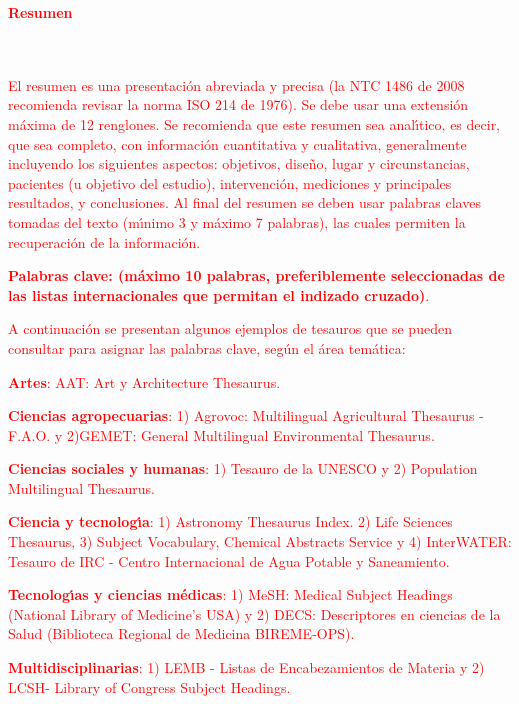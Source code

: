 
\newpage
\textcolor{red}{
\textbf{\LARGE Resumen}
\\\\
El resumen es una presentaci\'{o}n abreviada y precisa (la NTC 1486 de 2008 recomienda revisar la norma ISO 214 de 1976). Se debe usar una extensi\'{o}n m\'{a}xima de 12 renglones. Se recomienda que este resumen sea anal\'{\i}tico, es decir, que sea completo, con informaci\'{o}n cuantitativa y cualitativa, generalmente incluyendo los siguientes aspectos: objetivos, dise\~{n}o, lugar y circunstancias, pacientes (u objetivo del estudio), intervenci\'{o}n, mediciones y principales resultados, y conclusiones. Al final del resumen se deben usar palabras claves tomadas del texto (m\'{\i}nimo 3 y m\'{a}ximo 7 palabras), las cuales permiten la recuperaci\'{o}n de la informaci\'{o}n.\\
}

\textcolor{red}{
\textbf{\small Palabras clave: (m\'{a}ximo 10 palabras, preferiblemente seleccionadas de las listas internacionales que permitan el indizado cruzado)}.\\
}

\textcolor{red}{
A continuaci\'{o}n se presentan algunos ejemplos de tesauros que se pueden consultar para asignar las palabras clave, seg\'{u}n el \'{a}rea tem\'{a}tica:\\
}

\textcolor{red}{
\textbf{Artes}: AAT: Art y Architecture Thesaurus.
}

\textcolor{red}{
\textbf{Ciencias agropecuarias}: 1) Agrovoc: Multilingual Agricultural Thesaurus - F.A.O. y 2)GEMET: General Multilingual Environmental Thesaurus.
}

\textcolor{red}{
\textbf{Ciencias sociales y humanas}: 1) Tesauro de la UNESCO y 2) Population Multilingual Thesaurus.
}

\textcolor{red}{
\textbf{Ciencia y tecnolog\'{\i}a}: 1) Astronomy Thesaurus Index. 2) Life Sciences Thesaurus, 3) Subject Vocabulary, Chemical Abstracts Service y 4) InterWATER: Tesauro de IRC - Centro Internacional de Agua Potable y Saneamiento.
}

\textcolor{red}{
\textbf{Tecnolog\'{\i}as y ciencias m\'{e}dicas}: 1) MeSH: Medical Subject Headings (National Library of Medicine's USA) y 2) DECS: Descriptores en ciencias de la Salud (Biblioteca Regional de Medicina BIREME-OPS).
}

\textcolor{red}{
\textbf{Multidisciplinarias}: 1) LEMB - Listas de Encabezamientos de Materia y 2) LCSH- Library of Congress Subject Headings.\\
}

